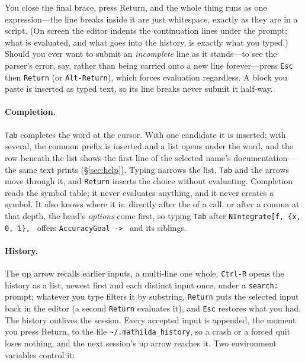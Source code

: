 \noindent
You close the final brace, press Return, and the whole thing runs as one
expression---the line breaks inside it are just whitespace, exactly as they are in a
script. (On screen the editor indents the continuation lines under the prompt;
what is evaluated, and what goes into the history, is exactly what you typed.)
Should you ever want to submit an \emph{incomplete} line as it stands---to
see the parser's error, say, rather than being carried onto a new line
forever---press \texttt{Esc} then \texttt{Return} (or \texttt{Alt-Return}), which
forces evaluation regardless. A block you paste is inserted as typed text, so its
line breaks never submit it half-way.

\paragraph{Completion.} \texttt{Tab} completes the word at the
cursor. With one candidate it is inserted; with several, the common prefix is
inserted and a list opens under the word, and the row beneath the list shows the
first line of the selected name's documentation---the same text 
prints (\S\ref{sec:help}). Typing narrows the list, \texttt{Tab} and the arrows move
through it, and \texttt{Return} inserts the choice without evaluating. Completion
reads the symbol table; it never evaluates anything, and it never creates a symbol.
It also knows where it is: directly after the \mcode{[} of a call, or after a comma
at that depth, the head's \emph{options} come first, so typing \texttt{Tab} after
\texttt{NIntegrate[f, \{x, 0, 1\}, } offers \texttt{AccuracyGoal -> } and its
siblings.

\paragraph{History.} The up arrow recalls earlier inputs, a
multi-line one whole. \texttt{Ctrl-R} opens the history as a list, newest first and
each distinct input once, under a \texttt{search:} prompt; whatever you type filters
it by substring, \texttt{Return} puts the selected input back in the editor (a
second \texttt{Return} evaluates it), and \texttt{Esc} restores what you had.
The history outlives the session. Every accepted input is
appended, the moment you press Return, to the file \texttt{\textasciitilde/.mathilda\_history}, so a
crash or a forced quit loses nothing, and the next session's up arrow reaches it.
Two environment variables control it:

